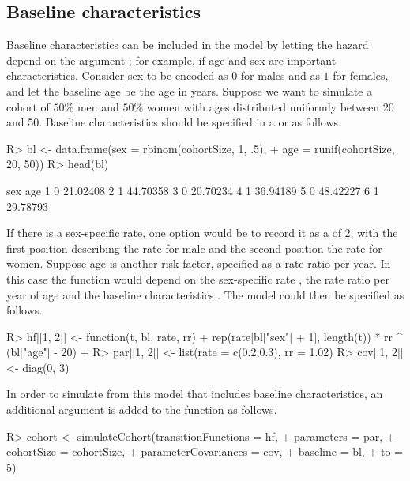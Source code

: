 \subsection{Baseline characteristics}\label{subsec:bl}
Baseline characteristics can be included in the model by letting the hazard depend on the argument ; for example, if age and sex are important characteristics. 
Consider sex  to be encoded as $0$ for males and as $1$ for females, and let the baseline age be the age in years. Suppose we want to simulate a cohort of $50\%$ men and $50\%$ women with ages distributed uniformly between 20 and 50. Baseline characteristics should be specified in a  or  as follows.
\begin{Schunk}
\begin{Sinput}
R>   bl <- data.frame(sex = rbinom(cohortSize, 1, .5), 
+                    age = runif(cohortSize, 20, 50))
R>   head(bl)
\end{Sinput}
\begin{Soutput}
  sex      age
1   0 21.02408
2   1 44.70358
3   0 20.70234
4   1 36.94189
5   0 48.42227
6   1 29.78793
\end{Soutput}
\end{Schunk}

If there is a sex-specific rate, one option would be to record it as a  of  $2$, with the first position describing the rate for male and the second position the rate for women. Suppose age is another risk factor, specified as a rate ratio per year. In this case the function would depend on the sex-specific rate , the rate ratio   per year of age and the baseline characteristics . The model could then be specified as follows. 
\begin{Schunk}
\begin{Sinput}
R>   hf[[1, 2]] <- function(t, bl, rate, rr) {
+     rep(rate[bl["sex"] + 1], length(t)) * rr ^ (bl["age"] - 20)
+   }
R>   par[[1, 2]] <- list(rate = c(0.2,0.3), rr = 1.02)
R>   cov[[1, 2]] <- diag(0, 3)
\end{Sinput}
\end{Schunk}

In order to simulate from this model that includes baseline characteristics, an additional argument  is added to the  function as follows. 
\begin{Schunk}
\begin{Sinput}
R>   cohort <- simulateCohort(transitionFunctions = hf, 
+                            parameters = par, 
+                            cohortSize = cohortSize, 
+                            parameterCovariances = cov, 
+                            baseline = bl,
+                            to = 5)
\end{Sinput}
\end{Schunk}


